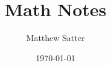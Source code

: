 \documentclass[11pt, notitlepage]{report}
\begin{document}
\title{Math Notes}
\author{Matthew Satter}
\date{\today}
\maketitle
\vspace{-2cm}
{\let\clearpage\relax \tableofcontents}

\thispagestyle{empty}








\end{document}
